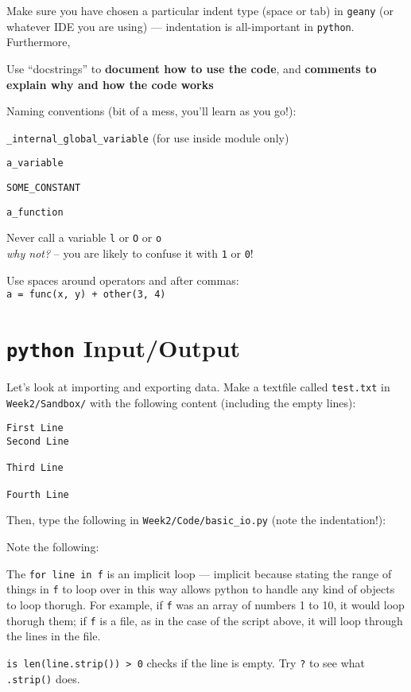 Make sure you have chosen a particular indent type (space or tab) in 
{\tt geany} (or whatever IDE you are using) --- indentation is all-important 
in {\tt python}. Furthermore, 
\begin{compactitem} \itemsep4pt
    \item Use ``docstrings'' to {\bf document how to use the code}, and
      {\bf comments to explain why and how the code works}
    \item Naming conventions (bit of a mess, you'll learn as you go!):
    \begin{compactitem}
      \item {\tt \_internal\_global\_variable} (for use inside module only)
      \item {\tt a\_variable}
      \item {\tt SOME\_CONSTANT}
      \item {\tt a\_function}
			\item Never call a variable {\tt l} or {\tt O} or {\tt o}\\ {\it 
			why not?} -- you are likely to confuse it with {\tt 1} or {\tt 0}!
    \end{compactitem}
	\item Use spaces around operators and after commas:\\ 
  {\tt  a = func(x, y) + other(3, 4)} 
\end{compactitem}

\section{{\tt python} Input/Output}

Let's look at importing and exporting data.  Make a textfile called 
{\tt test.txt} in {\tt Week2/Sandbox/} with the following content 
(including the empty lines):

\begin{lstlisting}
First Line
Second Line

Third Line

Fourth Line
\end{lstlisting}

Then, type the following in {\tt Week2/Code/basic\_io.py} (note the 
indentation!):



Note the following:

\begin{compactitem}
	\item The {\tt for line in f} is an implicit loop --- implicit 
	because stating the range of things in {\tt f} to loop over in this 
	way allows python to handle any kind of objects to loop thorugh. For 
	example, if {\tt f} was an array of numbers 1 to 10, it would loop 
	thorugh them; if {\tt f} is a file, as in the case of the script 
	above, it will loop through the lines in the file.
	
	\item {\tt is len(line.strip()) > 0} checks if the line is empty. Try 
	{\tt ?} to see what {\tt .strip()} does.	 
\end{compactitem}

